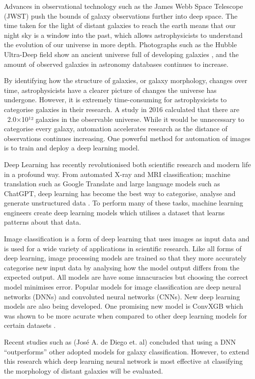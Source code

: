 \documentclass[12pt,runningheads]{llncs}
\begin{document}
Advances in observational technology such as the James Webb Space
Telescope (JWST) \cite{JWST} push the bounds of galaxy observations further
into deep space. The time taken for the light of distant galaxies to reach
the earth means that our night sky is a window into the past, which allows
astrophysicists to understand the evolution of our universe in more depth.
Photographs such as the Hubble Ultra-Deep field show an ancient universe full
of developing galaxies \cite{HUDF}, and the amount of observed galaxies in
astronomy databases continues to increase.

By identifying how the structure of galaxies, or galaxy morphology, changes over
time, astrophysicists have a clearer picture of changes the universe has
undergone. However, it is extremely time-consuming for astrophysicists to
categorise galaxies in their research. A study in 2016 \cite{EGND} calculated
that there are ~2.0×10¹² galaxies in the observable universe. While it would be
unnecessary to categorise every galaxy, automation accelerates research as
the distance of observations continues increasing. One powerful method for
automation of images is to train and deploy a deep learning model.

Deep Learning has recently revolutionised both scientific research and modern
life in a profound way. From automated X-ray and MRI classification;
machine translation such as Google Translate and large language models such as
ChatGPT, deep learning has become the best way to categorise, analyse and
generate unstructured data \cite{DLCTW}. To perform many of these tasks,
machine learning engineers create deep learning models which utilises a dataset
that learns patterns about that data.

Image classification is a form of deep learning that uses images as input data
and is used for a wide variety of applications in scientific research. Like
all forms of deep learning, image processing models are trained so that they
more accurately categorise new input data by analysing how the model output
differs from the expected output. All models are have some innacuracies but choosing
the correct model minimises error. Popular models for image classification are deep
neural networks (DNNs) and convoluted neural networks (CNNs). New deep learning
models are also being developed. One promising new model is ConvXGB which was
shown to be more acurate when compared to other deep learning models for certain
datasets \cite{CONVXGB}.

Recent studies such as (José A. de Diego et. al) \cite{GCDL} concluded that
using a DNN “outperforms” other adopted models for galaxy classification.
However, to extend this research which deep learning neural network is most
effective at classifying the morphology of distant galaxies will be evaluated.
\end{document}
